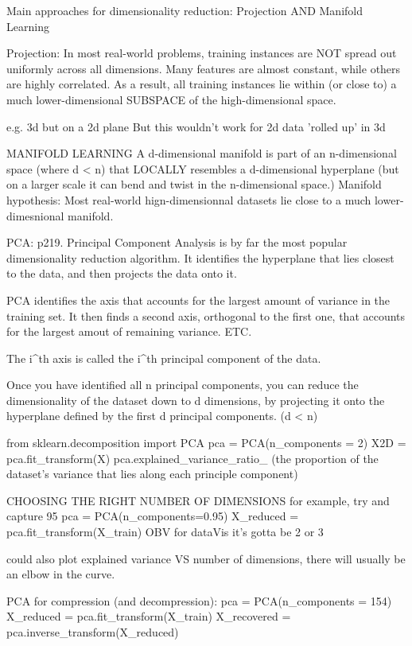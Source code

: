 Main approaches for dimensionality reduction:
Projection AND Manifold Learning

Projection:
In most real-world problems,
training instances are NOT spread out uniformly across all dimensions.
Many features are almost constant,
while others are highly correlated.
As a result, all training instances lie within (or close to)
a much lower-dimensional SUBSPACE of the high-dimensional space.

e.g. 3d but on a 2d plane
But this wouldn't work for 2d data 'rolled up' in 3d

MANIFOLD LEARNING
A d-dimensional manifold is part of an n-dimensional space (where d < n)
that LOCALLY resembles a d-dimensional hyperplane
(but on a larger scale it can bend and twist in the n-dimensional space.)
Manifold hypothesis:
Most real-world hign-dimensionnal datasets lie close to a much lower-dimesnional manifold.

PCA: p219.
Principal Component Analysis is by far the most popular dimensionality reduction algorithm.
It identifies the hyperplane that lies closest to the data,
and then projects the data onto it.

PCA identifies the axis that accounts for the largest amount of variance in the training set.
It then finds a second axis, orthogonal to the first one,
that accounts for the largest amout of remaining variance. ETC.

The i^th axis is called the i^th principal component of the data.

Once you have identified all n principal components,
you can reduce the dimensionality of the dataset down to d dimensions,
by projecting it onto the hyperplane defined by the first d principal components. (d < n)

from sklearn.decomposition import PCA
pca = PCA(n_components = 2)
X2D = pca.fit_transform(X)
pca.explained_variance_ratio_ (the proportion of the dataset's variance that lies along each principle component)

CHOOSING THE RIGHT NUMBER OF DIMENSIONS
for example, try and capture 95%
pca = PCA(n_components=0.95)
X_reduced = pca.fit_transform(X_train)
OBV for dataVis it's gotta be 2 or 3

could also plot explained variance VS number of dimensions,
there will usually be an elbow in the curve.

PCA for compression (and decompression):
pca = PCA(n_components = 154)
X_reduced = pca.fit_transform(X_train)
X_recovered = pca.inverse_transform(X_reduced)

